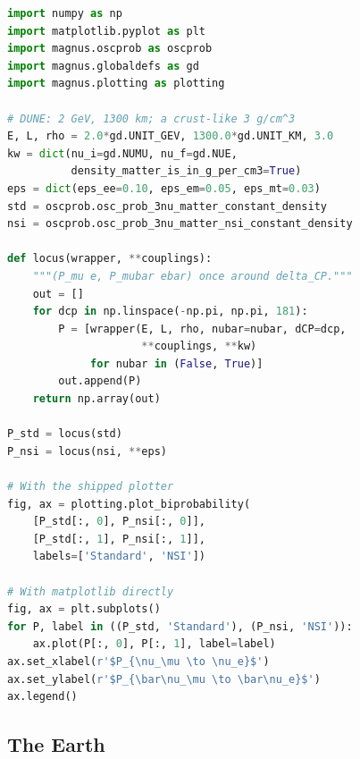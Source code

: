 \documentclass[final,5p,times,twocolumn,sort,compress]{elsarticle}
\makeatletter
\newcommand{\fig}{Fig.}
\DeclareRobustCommand{\_}{%
  \ifmmode\nfss@text{\textunderscore}\else\textunderscore\allowbreak\fi}
\newcommand{\figu}[1]{\fig~\ref{fig:#1}}
\makeatother
\begin{document}
\begin{lstlisting}[language=Python, caption={\textbf{Bi-probability curves at the DUNE baseline.} The two curves of \figu{biprobability}. The function {\tt locus} takes a wrapper once around $\delta_{\rm CP}$, computing the neutrino and the antineutrino probability at each of 181 values. The oscillation parameters are the default set, NuFIT 6.1. No tolerance is passed: the Hamiltonian is constant, so the Magnus expansion ends at its first term, and the result is exact. The curves are drawn twice: first with {\tt plotting.plot\_biprobability}, in the preset style of Sec.~\ref{sec:plotting}, then with {\tt matplotlib} directly. See notebooks \#05 and \#28, and Sec.~\ref{sec:biprobability} for details.}, label={lst:biprobability}, float=tbp]
import numpy as np
import matplotlib.pyplot as plt
import magnus.oscprob as oscprob
import magnus.globaldefs as gd
import magnus.plotting as plotting

# DUNE: 2 GeV, 1300 km; a crust-like 3 g/cm^3
E, L, rho = 2.0*gd.UNIT_GEV, 1300.0*gd.UNIT_KM, 3.0
kw = dict(nu_i=gd.NUMU, nu_f=gd.NUE,
          density_matter_is_in_g_per_cm3=True)
eps = dict(eps_ee=0.10, eps_em=0.05, eps_mt=0.03)
std = oscprob.osc_prob_3nu_matter_constant_density
nsi = oscprob.osc_prob_3nu_matter_nsi_constant_density

def locus(wrapper, **couplings):
    """(P_mu e, P_mubar ebar) once around delta_CP."""
    out = []
    for dcp in np.linspace(-np.pi, np.pi, 181):
        P = [wrapper(E, L, rho, nubar=nubar, dCP=dcp,
                     **couplings, **kw)
             for nubar in (False, True)]
        out.append(P)
    return np.array(out)

P_std = locus(std)
P_nsi = locus(nsi, **eps)

# With the shipped plotter
fig, ax = plotting.plot_biprobability(
    [P_std[:, 0], P_nsi[:, 0]],
    [P_std[:, 1], P_nsi[:, 1]],
    labels=['Standard', 'NSI'])

# With matplotlib directly
fig, ax = plt.subplots()
for P, label in ((P_std, 'Standard'), (P_nsi, 'NSI')):
    ax.plot(P[:, 0], P[:, 1], label=label)
ax.set_xlabel(r'$P_{\nu_\mu \to \nu_e}$')
ax.set_ylabel(r'$P_{\bar\nu_\mu \to \bar\nu_e}$')
ax.legend()
\end{lstlisting}


\subsection{The Earth}
\label{sec:prem}
\end{document}
